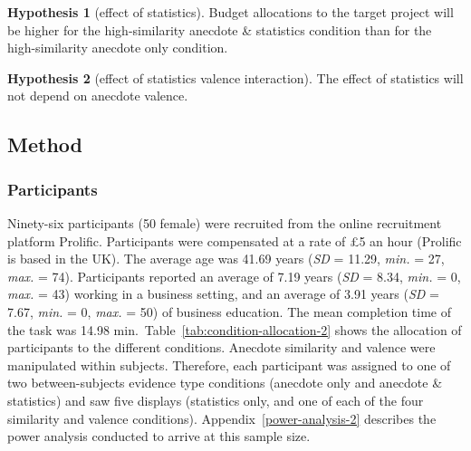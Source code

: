 \documentclass[
  man, donotrepeattitle,floatsintext]{apa7}
\theoremstyle{definition}
\theoremstyle{definition}
\theoremstyle{definition}
\theoremstyle{definition}
\newtheorem{hypothesis}{Hypothesis}
\theoremstyle{remark}
\begin{document}
\begin{hypothesis}[effect of statistics]
\protect\hypertarget{hyp:statistics-anecdotes-2}{}\label{hyp:statistics-anecdotes-2}Budget allocations to the target project will be higher
for the high-similarity anecdote \& statistics condition than for the
high-similarity anecdote only condition.
\end{hypothesis}

\begin{hypothesis}[effect of statistics valence interaction]
\protect\hypertarget{hyp:statistics-valence-interaction-2}{}\label{hyp:statistics-valence-interaction-2}The effect of statistics will not depend on anecdote valence.
\end{hypothesis}

\hypertarget{method}{%
\subsection{Method}\label{method}}

\hypertarget{participants-1}{%
\subsubsection{Participants}\label{participants-1}}

Ninety-six participants (50 female) were recruited from the online recruitment platform Prolific. Participants were compensated at a rate of \pounds 5 an hour (Prolific is based in the UK). The average age was 41.69 years (\emph{SD} = 11.29, \emph{min.} = 27, \emph{max.} = 74). Participants reported an average of 7.19 years (\emph{SD} = 8.34, \emph{min.} = 0, \emph{max.} = 43) working in a business setting, and an average of 3.91 years (\emph{SD} = 7.67, \emph{min.} = 0, \emph{max.} = 50) of business education. The mean completion time of the task was 14.98 min.~Table~\ref{tab:condition-allocation-2}
shows the allocation of participants to the different conditions. Anecdote
similarity and valence were manipulated within subjects. Therefore, each
participant was assigned to one of two between-subjects evidence type conditions
(anecdote only and anecdote \& statistics) and saw five displays (statistics
only, and one of each of the four similarity and valence conditions).
Appendix~\ref{power-analysis-2} describes the power analysis
conducted to arrive at this sample size.
\end{document}

